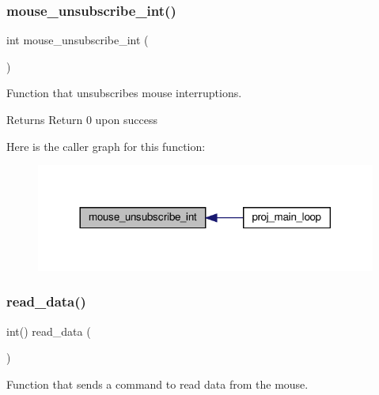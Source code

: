 \subsubsection{\texorpdfstring{mouse\+\_\+unsubscribe\+\_\+int()}{mouse\_unsubscribe\_int()}}
{\footnotesize\ttfamily int mouse\+\_\+unsubscribe\+\_\+int (\begin{DoxyParamCaption}{ }\end{DoxyParamCaption})}



Function that unsubscribes mouse interruptions. 

\begin{DoxyReturn}{Returns}
Return 0 upon success 
\end{DoxyReturn}
Here is the caller graph for this function\+:
\nopagebreak
\begin{figure}[H]
\begin{center}
\leavevmode
\includegraphics[width=317pt]{group__mouse_ga685ad2706aca36d9869a30a19b9f446a_icgraph}
\end{center}
\end{figure}
\mbox{\label{group__mouse_gad25b8bf71166026dbf192c6d013d54d6}} 
\subsubsection{\texorpdfstring{read\+\_\+data()}{read\_data()}}
{\footnotesize\ttfamily int() read\+\_\+data (\begin{DoxyParamCaption}{ }\end{DoxyParamCaption})}



Function that sends a command to read data from the mouse. 

